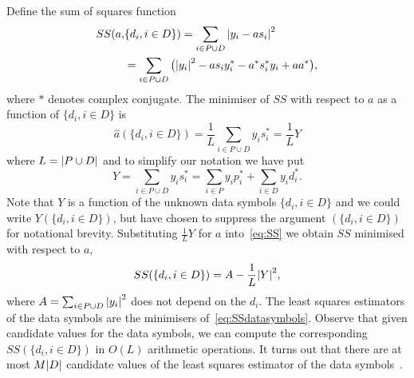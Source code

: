 \documentclass[journal]{IEEEtran}
\begin{document}
Define the sum of squares function
\begin{align}
SS(a, &\{d_i, i \in D\}) = \sum_{i \in P \cup D} {\left\vert  y_i - a s_i  \right\vert}^2 \nonumber \\
&= \sum_{i \in P \cup D} \big( {\left\vert y_i \right\vert}^2 - a s_i y_i^* - a^* s_i^* y_i + aa^* \big), \label{eq:SS}
\end{align}
where $*$ denotes complex conjugate.  The minimiser of $SS$ with respect to $a$ as a function of $\{d_i, i \in D\}$ is
\begin{equation}\label{eq:hata}
\hat{a}(\{d_i, i \in D\}) = \frac{1}{L} \sum_{i \in P \cup D} y_i s_i^* = \frac{1}{L} Y
\end{equation}
where $L = {\left\vert P \cup D \right\vert}$ and to simplify our notation we have put 
\[
Y = \sum_{i \in P \cup D} y_i s_i^* = \sum_{i \in P } y_i p_i^* + \sum_{i \in D } y_i d_i^*.
\]  
Note that $Y$ is a function of the unknown data symbols $\{ d_i, i \in D\}$ and we could write $Y(\{ d_i, i \in D\})$, but have chosen to suppress the argument $(\{ d_i, i \in D\})$ for notational brevity.  Substituting $\frac{1}{L}Y$ for $a$ into~\eqref{eq:SS} we obtain $SS$ minimised with respect to $a$,
\begin{equation}\label{eq:SSdatasymbols}
SS(\{d_i, i \in D\}) = A - \frac{1}{L}{\left\vert Y \right\vert}^2,
\end{equation}
where $A = \sum_{i \in P \cup D}{\left\vert y_i \right\vert}^2$ does not depend on the $d_i$.  The least squares estimators of the data symbols are the minimisers of~\eqref{eq:SSdatasymbols}.  Observe that given candidate values for the data symbols, we can compute the corresponding $SS(\{d_i, i \in D\})$ in $O(L)$ arithmetic operations.  It turns out that there are at most $M{\left\vert D \right\vert}$ candidate values of the least squares estimator of the data symbols~\cite{Sweldens2001,Mackenthun1994}.  %
\end{document}
